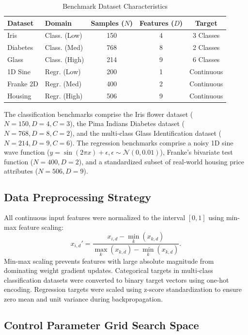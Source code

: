\documentclass[10pt, conference]{IEEEtran}
\begin{document}
\begin{table}[t]
\caption{Benchmark Dataset Characteristics}
\label{tab:datasets}
\centering
\footnotesize
\setlength{\tabcolsep}{5pt}
\begin{tabular}{llccc}
\toprule
Dataset & Domain & Samples ($N$) & Features ($D$) & Target \\
\midrule
Iris      & Class. (Low)  & 150 & 4 & 3 Classes \\
Diabetes  & Class. (Med)  & 768 & 8 & 2 Classes \\
Glass     & Class. (High) & 214 & 9 & 6 Classes \\
1D Sine   & Regr. (Low)   & 200 & 1 & Continuous \\
Franke 2D & Regr. (Med)   & 400 & 2 & Continuous \\
Housing   & Regr. (High)  & 506 & 9 & Continuous \\
\bottomrule
\end{tabular}
\end{table}

The classification benchmarks comprise the Iris flower dataset ($N = 150, D = 4, C = 3$), the Pima Indians Diabetes dataset ($N = 768, D = 8, C = 2$), and the multi-class Glass Identification dataset ($N = 214, D = 9, C = 6$). The regression benchmarks comprise a noisy 1D sine wave function ($y = \sin(2\pi x) + \epsilon, \epsilon \sim \mathcal{N}(0, 0.01)$), Franke's bivariate test function ($N = 400, D = 2$), and a standardized subset of real-world housing price attributes ($N = 506, D = 9$).

\subsection{Data Preprocessing Strategy}

All continuous input features were normalized to the interval $[0, 1]$ using min-max feature scaling:
\begin{equation}
x_{i, d}' = \frac{x_{i, d} - \min_k(x_{k, d})}{\max_k(x_{k, d}) - \min_k(x_{k, d})}.
\end{equation}
Min-max scaling prevents features with large absolute magnitude from dominating weight gradient updates. Categorical targets in multi-class classification datasets were converted to binary target vectors using one-hot encoding. Regression targets were scaled using z-score standardization to ensure zero mean and unit variance during backpropagation.

\subsection{Control Parameter Grid Search Space}
\end{document}
